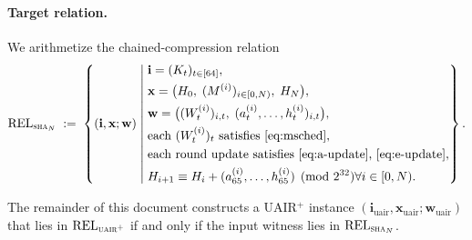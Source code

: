 \paragraph{Target relation.}
We arithmetize the chained-compression relation
\begin{equation}\label{eq:rel-sha}
\mathrm{REL}_{\textsc{sha}_N} \;:=\;
\left\{(\mathbf{i},\mathbf{x};\mathbf{w}) \;\middle|\;
\begin{aligned}
&\mathbf{i} = (K_t)_{t\in[64]}, \\
&\mathbf{x} = \bigl(H_0,\;(M^{(i)})_{i \in [0,N)},\;H_N\bigr), \\
&\mathbf{w} = \bigl((W_t^{(i)})_{i,t},\;(a_t^{(i)},\dots,h_t^{(i)})_{i,t}\bigr), \\
&\text{each } (W_t^{(i)})_t \text{ satisfies \eqref{eq:msched}}, \\
&\text{each round update satisfies \eqref{eq:a-update}, \eqref{eq:e-update}}, \\
&H_{i+1} \equiv H_i + (a_{65}^{(i)},\dots,h_{65}^{(i)}) \pmod{2^{32}} \forall i \in [0,N).
\end{aligned}\right\}.
\end{equation}

The remainder of this document constructs a UAIR$^+$ instance
$(\mathbf{i}_{\text{uair}},\mathbf{x}_{\text{uair}};\mathbf{w}_{\text{uair}})$
that lies in $\mathrm{REL}_{\textsc{uair}^+}$ if and only if the input
witness lies in $\mathrm{REL}_{\textsc{sha}_N}$.
